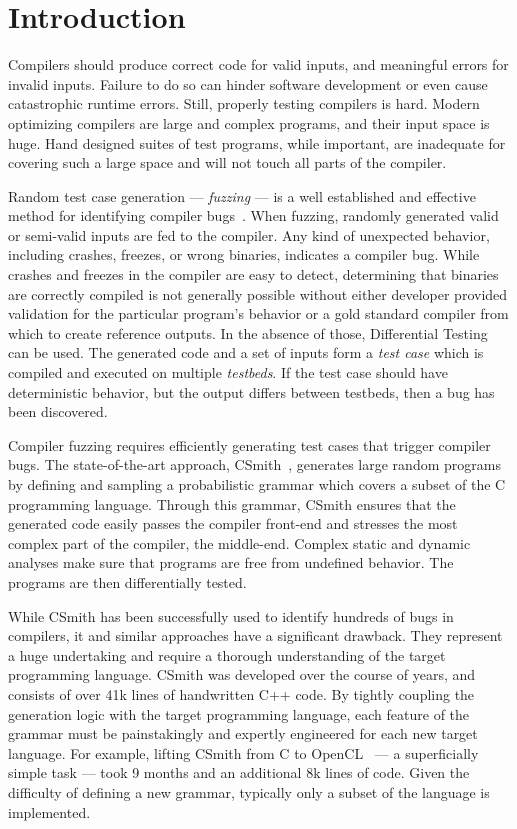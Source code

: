\section{Introduction}\label{sec:intro}

Compilers should produce correct code for valid inputs, and meaningful errors
for invalid inputs. Failure to do so can hinder software development or even
cause catastrophic runtime errors. Still, properly testing compilers is hard.
Modern optimizing compilers are large and complex programs, and their input
space is huge. Hand designed suites of test programs, while important, are
inadequate for covering such a large space and will not touch all parts of the
compiler.

Random test case generation --- \emph{fuzzing} --- is a well established and
effective method for identifying compiler
bugs~\cite{Chen2014a,Chen2013,Kossatchev2005}. When fuzzing, randomly generated
valid or semi-valid inputs are fed to the compiler. Any kind of unexpected
behavior, including crashes, freezes, or wrong binaries, indicates a compiler
bug. While crashes and freezes in the compiler are easy to detect, determining
that binaries are correctly compiled is not generally possible without either
developer provided validation for the particular program's behavior or a gold
standard compiler from which to create reference outputs. In the absence of
those, Differential Testing~\cite{McKeeman1998} can be used. The generated code
and a set of inputs form a \emph{test case} which is compiled and executed on
multiple \emph{testbeds}. If the test case should have deterministic behavior,
but the output differs between testbeds, then a bug has been discovered.

Compiler fuzzing requires efficiently generating test cases that trigger
compiler bugs. The state-of-the-art approach, CSmith~\cite{Yang2011}, generates
large random programs by defining and sampling a probabilistic grammar which
covers a subset of the C programming language. Through this grammar, CSmith
ensures that the generated code easily passes the compiler front-end and
stresses the most complex part of the compiler, the middle-end.  Complex static
and dynamic analyses make sure that programs are free from undefined behavior.
The programs are then differentially tested.

While CSmith has been successfully used to identify hundreds of bugs in
compilers, it and similar approaches have a significant drawback. They represent
a huge undertaking and require a thorough understanding of the target
programming language. CSmith was developed over the course of years, and
consists of over 41k lines of handwritten C++ code. By tightly coupling the
generation logic with the target programming language, each feature of the
grammar must be painstakingly and expertly engineered for each new target
language. For example, lifting CSmith from C to OpenCL~\cite{Lidbury2015a} --- a
superficially simple task --- took 9 months and an additional 8k lines of code.
Given the difficulty of defining a new grammar, typically only a subset of the
language is implemented.

